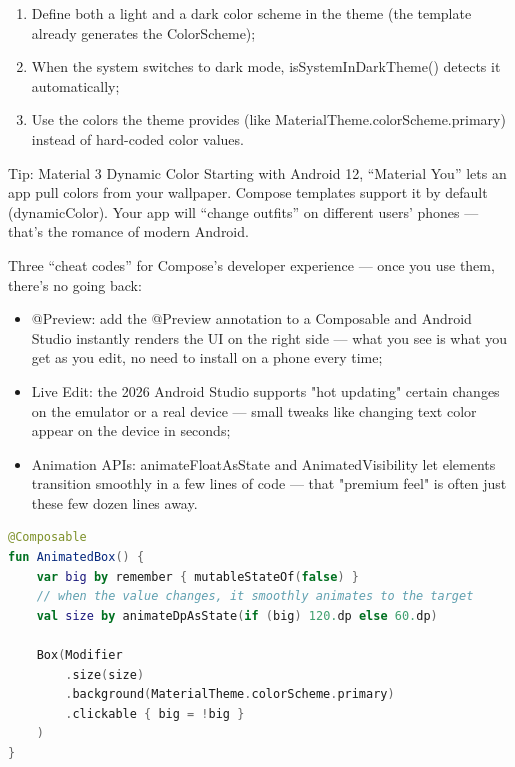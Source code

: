 \begin{enumerate}
  \item Define both a light and a dark color scheme in the theme (the template already generates the ColorScheme);
  \item When the system switches to dark mode, isSystemInDarkTheme() detects it automatically;
  \item Use the colors the theme provides (like MaterialTheme.colorScheme.primary) instead of hard-coded color values.
\end{enumerate}

\begin{tcbinfo}{Tip: Material 3 Dynamic Color}
Starting with Android 12, “Material You” lets an app pull colors from your wallpaper. Compose templates support it by default (dynamicColor). Your app will “change outfits” on different users' phones — that's the romance of modern Android.

\end{tcbinfo}


Three “cheat codes” for Compose's developer experience — once you use them, there's no going back:

\begin{itemize}
  \item @Preview: add the @Preview annotation to a Composable and Android Studio instantly renders the UI on the right side — what you see is what you get as you edit, no need to install on a phone every time;
  \item Live Edit: the 2026 Android Studio supports "hot updating" certain changes on the emulator or a real device — small tweaks like changing text color appear on the device in seconds;
  \item Animation APIs: animateFloatAsState and AnimatedVisibility let elements transition smoothly in a few lines of code — that "premium feel" is often just these few dozen lines away.
\end{itemize}

\begin{lstlisting}[language=Kotlin]
@Composable
fun AnimatedBox() {
    var big by remember { mutableStateOf(false) }
    // when the value changes, it smoothly animates to the target
    val size by animateDpAsState(if (big) 120.dp else 60.dp)

    Box(Modifier
        .size(size)
        .background(MaterialTheme.colorScheme.primary)
        .clickable { big = !big }
    )
}
\end{lstlisting}

